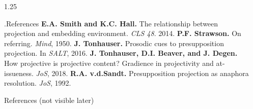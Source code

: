 \documentclass[final, table]{beamer}
\newlength{\sepwidth}
\newlength{\colwidth}
\newcommand{\separatorcolumn}{\begin{column}{\sepwidth}\end{column}}
\begin{document}
\begin{frame}[t]
\begin{columns}[t]
\begin{column}{1.25\colwidth}
\begin{normalbox}{\phantom.\hfill References}
				\textbf{E.A. Smith and K.C. Hall.} The relationship between projection and embedding environment. \textit{CLS 48}. 2014.\quad\textbullet\quad
				\textbf{P.F. Strawson.} On referring. \textit{Mind}, 1950.\quad\textbullet\quad
				\textbf{J. Tonhauser.} Prosodic cues to presupposition projection. In \textit{SALT}, 2016.\quad\textbullet\quad
				\textbf{J. Tonhauser, D.I. Beaver, and J. Degen.} How projective is projective content? Gradience in projectivity and at-issueness. \textit{JoS}, 2018.\quad\textbullet\quad
				\textbf{R.A. v.d.Sandt.} Presupposition projection as anaphora resolution. \textit{JoS}, 1992.

			\end{normalbox}

			\vspace{20\baselineskip}
			\begin{normalbox}{References (not visible later)}
				
				
			\end{normalbox}

		\end{column}
		\separatorcolumn
	\end{columns}



\end{frame}
\end{document}
